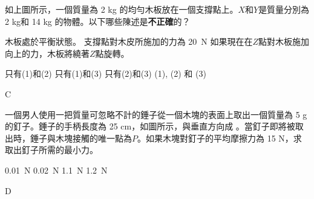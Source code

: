 {
     \par\bigskip
    如上圖所示，一個質量為 2 kg 的均勻木板放在一個支撐點上。$X$和$Y$是質量分別為 2 kg和 14 kg 的物體。以下哪些陳述是\textbf{不正確}的？
    \begin{statements}
        \task 木板處於平衡狀態。
        \task 支撐點對木皮所施加的力為 \qty{20}{N}
        \task 如果現在在$Z$點對木板施加向上的力，木板將繞著$Z$點旋轉。
    \end{statements}
    \begin{tasks}
        \task 只有(1)和(2)
        \task 只有(1)和(3)
        \task 只有(2)和(3)
        \task (1), (2) 和 (3)
    \end{tasks}
}{C}

{
    \bigskip
    一個男人使用一把質量可忽略不計的錘子從一個木塊的表面上取出一個質量為 5 g 的釘子。錘子的手柄長度為 25 cm，如圖所示，與垂直方向成 。當釘子即將被取出時，錘子與木塊接觸的唯一點為$P$。如果木塊對釘子的平均摩擦力為 15 N，求取出釘子所需的最小力。
    \begin{tasks}
        \task \qty{0.01}{N}
        \task \qty{0.02}{N}
        \task \qty{1.1}{N}
        \task \qty{1.2}{N}
    \end{tasks}
}{D}

